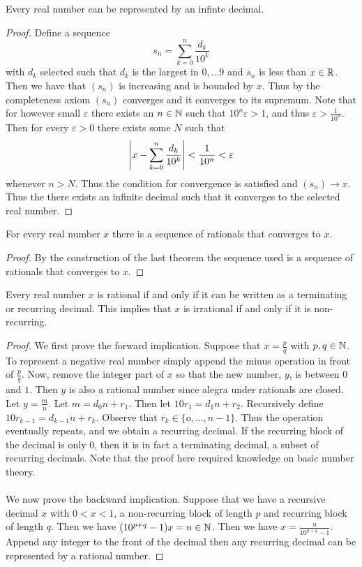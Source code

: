 \documentclass[a4paper]{article}
\begin{document}
\begin{thm}{}{} Every real number can be represented by an infinte decimal. \tcbline
\begin{proof} Define a sequence $$s_n=\sum_{k=0}^{n}\frac{d_k}{10^k}$$ with $d_k$ selected such that $d_k$ is the largest in ${0,\dots 9}$ and $s_n$ is less than $x\in\mathbb{R}$. Then we have that $(s_n)$ is increasing and is bounded by $x$. Thus by the completeness axiom $(s_n)$ converges and it converges to its supremum. Note that for however small $\varepsilon$ there exists an $n\in\mathbb{N}$ such that $10^n\varepsilon>1$, and thus $\varepsilon>\frac{1}{10^n}$. Then for every $\varepsilon>0$ there exists some $N$ such that $$\abs{x-\sum_{k=0}^{n}\frac{d_k}{10^k}}<\frac{1}{10^n}<\varepsilon$$ whenever $n>N$. Thus the condition for convergence is satisfied and $(s_n)\to x$. Thus the there exists an infinite decimal such that it converges to the selected real number. 
\end{proof}
\end{thm}

\begin{lmm}{}{} For every real number $x$ there is a sequence of rationals that converges to $x$. \tcbline
\begin{proof} By the construction of the last theorem the sequence used is a sequence of rationals that converges to $x$. 
\end{proof}
\end{lmm} 

\begin{thm}{}{} Every real number $x$ is rational if and only if it can be written as a terminating or recurring decimal. This implies that $x$ is irrational if and only if it is non-recurring. \tcbline
\begin{proof} We first prove the forward implication. Suppose that $x=\frac{p}{q}$ with $p,q\in\mathbb{N}$. To represent a negative real number simply append the minus operation in front of $\frac{p}{q}$. Now, remove the integer part of $x$ so that the new number, $y$, is between $0$ and $1$. Then $y$ is also a rational number since alegra under rationals are closed. Let $y=\frac{m}{n}$. Let $m=d_0n+r_1$. Then let $10r_1=d_1n+r_2$. Recursively define $10r_{k-1}=d_{k-1}n+r_k$. Observe that $r_k\in\{o,\dots,n-1\}$. Thus the operation eventually repeats, and we obtain a recurring decimal. If the recurring block of the decimal is only $0$, then it is in fact a terminating decimal, a subset of recurring decimals. Note that the proof here required knowledge on basic number theory. \\~\\
We now prove the backward implication. Suppose that we have a recursive decimal $x$ with $0<x<1$, a non-recurring block of length $p$ and recurring block of length $q$. Then we have $(10^{p+q}-1)x=n\in\mathbb{N}$. Then we have $x=\frac{n}{10^{p+q}-1}$. Append any integer to the front of the decimal then any recurring decimal can be represented by a rational number. 
\end{proof}
\end{thm}
\end{document}
